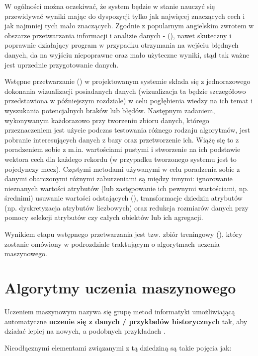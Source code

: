 W ogólności można oczekiwać, że system będzie w stanie nauczyć się przewidywać wyniki mając do dyspozycji tylko jak najwięcej znaczących cech i jak najmniej tych mało znaczących. Zgodnie z popularnym angielskim zwrotem w obszarze przetwarzania informacji i analizie danych -   (), nawet skuteczny i poprawnie działający program w przypadku otrzymania na wejściu błędnych danych, da na wyjściu niepoprawne oraz mało użyteczne wyniki, stąd tak ważne jest uprzednie przygotowanie danych.

Wstępne przetwarzanie () w projektowanym systemie składa się z jednorazowego dokonania wizualizacji posiadanych danych (wizualizacja ta będzie szczegółowo przedstawiona w późniejszym rozdziale) w celu pogłębienia wiedzy na ich temat i wyszukania potencjalnych braków lub błędów. Następnym zadaniem, wykonywanym każdorazowo przy tworzeniu zbioru danych, którego przeznaczeniem jest użycie podczas testowania różnego rodzaju algorytmów, jest pobranie interesujących danych z bazy oraz przetworzenie ich. Wiążę się to z poradzeniem sobie z m.in. wartościami pustymi i stworzenie na ich podstawie wektora cech dla każdego rekordu (w przypadku tworzonego systemu jest to pojedynczy mecz). Częstymi metodami używanymi w celu poradzenia sobie z danymi obarczonymi różnymi zaburzeniami są między innymi: ignorowanie nieznanych wartości atrybutów (lub zastępowanie ich pewnymi wartościami, np. średnimi) usuwanie wartości odstających (), transformacje dziedzin atrybutów (np. dyskretyzacja atrybutów liczbowych) oraz redukcja rozmiarów danych przy pomocy selekcji atrybutów czy całych obiektów lub ich agregacji.

Wynikiem etapu wstępnego przetwarzania jest tzw. zbiór treningowy (), który zostanie omówiony w podrozdziale traktującym o algorytmach uczenia maszynowego.

\section{Algorytmy uczenia maszynowego} \label{ml-algorithms}
\noindent Uczeniem maszynowym nazywa się grupę metod informatyki umożliwiającą automatyczne \textbf{uczenie się z danych / przykładów historycznych} tak, aby działać lepiej na nowych, a podobnych przykładach \cite{Geron}.

Nieodłącznymi elementami związanymi z tą dziedziną są takie pojęcia jak:

